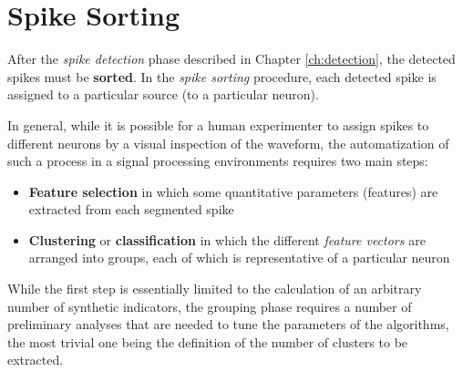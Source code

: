 \chapter{Spike Sorting}
\label{ch:sorting}
After the \emph{spike detection} phase described in Chapter \ref{ch:detection}, the detected spikes must be \textbf{sorted}. In the \emph{spike sorting} procedure, each detected spike is assigned to a particular source (\ie to a particular neuron). 

In general, while it is possible for a human experimenter to assign spikes to different neurons by a visual inspection of the waveform, the automatization of such a process in a signal processing environments requires two main steps:
\begin{itemize}
    \item \textbf{Feature selection} in which some quantitative parameters (\ie features) are extracted from each segmented spike
    \item \textbf{Clustering} or \textbf{classification} in which the different \emph{feature vectors} are arranged into groups, each of which is representative of a particular neuron
\end{itemize}

While the first step is essentially limited to the calculation of an arbitrary number of synthetic indicators, the grouping phase requires a number of preliminary analyses that are needed to tune the parameters of the algorithms, the most trivial one being the definition of the number of clusters to be extracted.